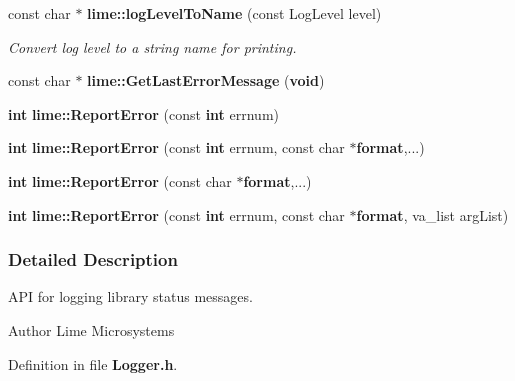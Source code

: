 \begin{DoxyCompactItemize}
\item 
const char $\ast$ {\bf lime\+::log\+Level\+To\+Name} (const Log\+Level level)
\begin{DoxyCompactList}\small\item\em Convert log level to a string name for printing. \end{DoxyCompactList}\item 
const char $\ast$ {\bf lime\+::\+Get\+Last\+Error\+Message} ({\bf void})
\item 
{\bf int} {\bf lime\+::\+Report\+Error} (const {\bf int} errnum)
\item 
{\bf int} {\bf lime\+::\+Report\+Error} (const {\bf int} errnum, const char $\ast${\bf format},...)
\item 
{\bf int} {\bf lime\+::\+Report\+Error} (const char $\ast${\bf format},...)
\item 
{\bf int} {\bf lime\+::\+Report\+Error} (const {\bf int} errnum, const char $\ast${\bf format}, va\+\_\+list arg\+List)
\end{DoxyCompactItemize}


\subsubsection{Detailed Description}
A\+PI for logging library status messages. 

\begin{DoxyAuthor}{Author}
Lime Microsystems 
\end{DoxyAuthor}


Definition in file {\bf Logger.\+h}.

